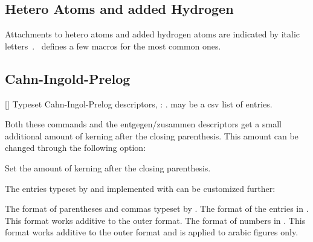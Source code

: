 \documentclass{chemmacros-manual}
\begin{document}
\begin{example}
   \par
\end{example}

\subsection{Hetero Atoms and added Hydrogen}

Attachments to hetero atoms and added hydrogen atoms are indicated by italic
letters~\cite{iupac:greenbook}.  \chemmacros\ defines a few macros for the
most common ones.
\begin{commands}
\end{commands}
\begin{example}
  
  
\end{example}

\subsection{Cahn-Ingold-Prelog}\label{par:cip}
\begin{commands}
  []
    Typeset Cahn-Ingol-Prelog descriptors, \eg: 
    .  may be a csv list of entries.
\end{commands}

Both these commands and the entgegen/zusammen descriptors get a small
additional amount of kerning after the closing parenthesis.  This amount can
be changed through the following option:
\begin{options}
  \Default{.075em}
    Set the amount of kerning after the closing parenthesis.
\end{options}
The entries typeset by and implemented with  can be customized
further:
\begin{options}
    The format of parentheses and commas typeset by
    .
    The format of the entries in .  This format
    works additive to the outer format.
    The format of numbers in .  This format works
    additive to the outer format and is applied to arabic figures only.
\end{options}
\end{document}
